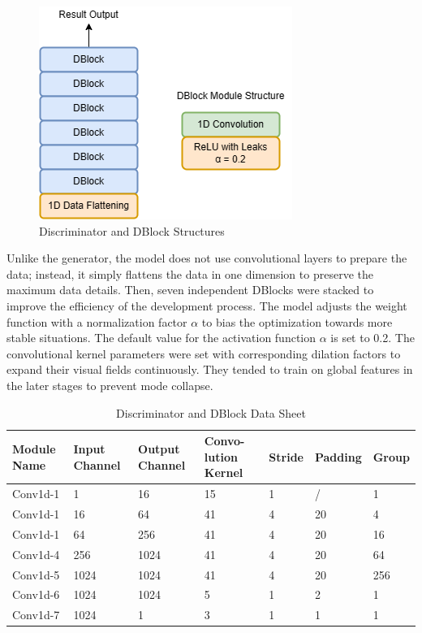 \documentclass[10pt,journal,compsoc]{IEEEtran}
\begin{document}
\begin{figure}
    \centering
    \includegraphics[scale=0.7] {PNG/3-4.png}
    \caption{Discriminator and DBlock Structures}
    \label{fig:3-4}
\end{figure}

Unlike the generator, the model does not use convolutional layers to prepare the data; instead, it simply flattens the data in one dimension to preserve the maximum data details. Then, seven independent DBlocks were stacked to improve the efficiency of the development process. The model adjusts the weight function with a normalization factor $\alpha$ to bias the optimization towards more stable situations. The default value for the activation function $\alpha$ is set to 0.2. The convolutional kernel parameters were set with corresponding dilation factors to expand their visual fields continuously. They tended to train on global features in the later stages to prevent mode collapse.

\begin{table}[ht]
\centering
\caption{Discriminator and DBlock Data Sheet}
\label{tab:3-2}
\begin{tabularx}{0.5\textwidth}{|X|X|X|X|X|X|X|}
\hline
  Module Name & Input Channel & Output Channel & Convo-lution Kernel & Stride & Padding & Group \\
\hline
  Conv1d-1 & 1 & 16 & 15 & 1 & / & 1 \\
\hline
  Conv1d-1 & 16 & 64 & 41 & 4 & 20 & 4 \\
\hline
  Conv1d-1 & 64 & 256 & 41 & 4 & 20 & 16 \\
\hline
  Conv1d-4 & 256 & 1024 & 41 & 4 & 20 & 64 \\
\hline
  Conv1d-5 & 1024 & 1024 & 41 & 4 & 20 & 256 \\
\hline
  Conv1d-6 & 1024 & 1024 & 5 & 1 & 2 & 1 \\
\hline
  Conv1d-7 & 1024 & 1 & 3 & 1 & 1 & 1 \\
\hline
\end{tabularx}
\end{table}
\end{document}
